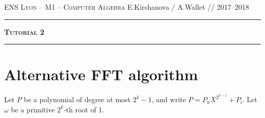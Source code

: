 \documentclass[11pt]{exam}
\theoremstyle{definition}
\begin{document}
{\noindent
   \textsc{ENS Lyon --  M1 -- Computer Algebra}
   \hfill { E.Kirshanova / A.Wallet // 2017--2018\\
   }
  }
  \hrule
  \begin{center}
    {\Large\textbf{
   \textsc{Tutorial 2}
    } } 
  \end{center}
  \hrule \vspace{5mm}

\thispagestyle{empty}

\vspace{0.2cm}

\section{Alternative FFT algorithm}

Let $P$ be a polynomial of degree at most $2^k - 1$, and write
$P = P_h X^{2^{k-1}} + P_l$. Let $\omega$ be a primitive $2^k$-th root of 1.
\end{document}
